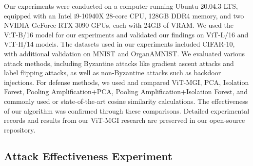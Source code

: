 \documentclass[conference]{IEEEtran}
\begin{document}


Our experiments were conducted on a computer running Ubuntu 20.04.3 LTS, equipped with an Intel i9-10940X 28-core CPU, 128GB DDR4 memory, and two NVIDIA GeForce RTX 3090 GPUs, each with 24GB of VRAM. We used the ViT-B/16 model for our experiments and validated our findings on ViT-L/16 and ViT-H/14 models. The datasets used in our experiments included CIFAR-10, with additional validation on MNIST and OrganAMNIST. We evaluated various attack methods, including Byzantine attacks like gradient ascent attacks and label flipping attacks, as well as non-Byzantine attacks such as backdoor injections. For defense methods, we used and compared ViT-MGI, PCA, Isolation Forest, Pooling Amplification\cite{betterTogether}+PCA, Pooling Amplification+Isolation Forest, and commonly used or state-of-the-art cosine similarity calculations. The effectiveness of our algorithm was confirmed through these comparisons. Detailed experimental records and results from our ViT-MGI research are preserved in our open-source repository.

\subsection{Attack Effectiveness Experiment}
\label{exp:attack}
\end{document}
